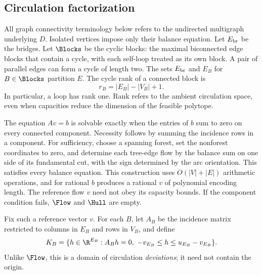 \subsection{Circulation factorization}\label{subsec:block-factorization}
All graph connectivity terminology below refers to the undirected multigraph
underlying $D$. Isolated vertices impose only their balance equation. Let
$E_{\rm br}$ be the bridges. Let $\Blocks$ be the cyclic blocks: the maximal
biconnected edge blocks that contain a cycle, with each self-loop treated as
its own block. A pair of parallel edges can form a cycle of length two.
The sets $E_{\rm br}$ and $E_B$ for $B\in\Blocks$ partition $E$.
The cycle rank of a connected block is
\begin{equation}\label{eq:cycle-rank}
 r_B=|E_B|-|V_B|+1.
\end{equation}
In particular, a loop has rank one. Rank refers to the ambient circulation
space, even when capacities reduce the dimension of the feasible polytope.

The equation $Av=b$ is solvable exactly when the entries of $b$ sum to zero
on every connected component. Necessity follows by summing the incidence
rows in a component. For sufficiency, choose a spanning forest, set the
nonforest coordinates to zero, and determine each tree-edge flow by the
balance sum on one side of its fundamental cut, with the sign determined by
the arc orientation. This satisfies every balance equation. This construction
uses $O(|V|+|E|)$ arithmetic operations, and for rational $b$ produces a
rational $v$ of polynomial encoding length. The reference flow $v$ need not
obey its capacity bounds. If the component condition fails, $\Flow$ and
$\Hull$ are empty.

Fix such a reference vector $v$. For each $B$, let $A_B$ be the incidence
matrix restricted to columns in $E_B$ and rows in $V_B$, and define
\begin{equation}\label{eq:block-domain}
 K_B=\{h\in\R^{E_B}:A_Bh=0,\ -v_{E_B}\le h\le u_{E_B}-v_{E_B}\}.
\end{equation}
Unlike $\Flow$, this is a domain of circulation \emph{deviations}; it need
not contain the origin.

